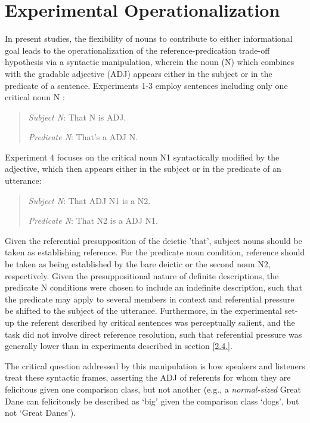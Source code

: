 \section{Experimental Operationalization}
\label{3.2.}
In present studies, the flexibility of nouns to contribute to either informational goal leads to the operationalization of the reference-predication trade-off hypothesis via a syntactic manipulation, wherein the noun (N) which combines with the gradable adjective (ADJ) appears either in the subject or in the predicate of a sentence. Experiments 1-3 employ sentences including only one critical noun N \parencite{tessler2020}:
\begin{quotation}
	\textit{Subject N}: That N is ADJ. 
	
	\textit{Predicate N}: That's a ADJ N.
\end{quotation}
Experiment 4 focuses on the critical noun N1 syntactically modified by the adjective, which then appears either in the subject or in the predicate of an utterance: 
\begin{quotation}
	\textit{Subject N}: That ADJ N1 is a N2. 
	 
	\textit{Predicate N}: That N2 is a ADJ N1.
\end{quotation} 
Given the referential presupposition of the deictic 'that', subject nouns should be taken as establishing reference.  For the predicate noun condition, reference should be taken as being established by the bare deictic or the second noun N2, respectively. Given the presuppositional nature of definite descriptions, the predicate N conditions were chosen to include an indefinite description, such that the predicate may apply to several members in context and referential pressure be shifted to the subject of the utterance. Furthermore, in the experimental set-up the referent described by critical sentences was perceptually salient, and the task did not involve direct reference resolution, such that referential pressure was generally lower than in experiments described in section \ref{2.4.}.

The critical question addressed by this manipulation is how speakers and listeners treat these syntactic frames, asserting the ADJ of referents for whom they are felicitous given one comparison class, but not another (e.g., a \emph{normal-sized} Great Dane can felicitously be described as ‘big’ given the comparison class ‘dogs’, but not ‘Great Danes’). 


